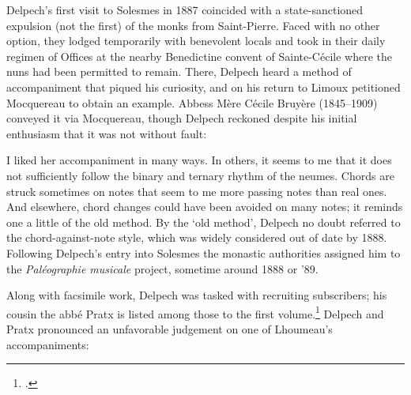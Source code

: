 Delpech's first visit to Solesmes in 1887 coincided with a state-sanctioned expulsion (not the first) of the monks from Saint-Pierre.
Faced with no other option, they lodged temporarily with benevolent locals and took in their daily regimen of Offices at the nearby Benedictine convent of Sainte-Cécile where the nuns had been permitted to remain.
There, Delpech heard a method of accompaniment that piqued his curiosity, and on his return to Limoux petitioned Mocquereau to obtain an example.
Abbess Mère Cécile Bruyère (1845--1909) conveyed it via Mocquereau, though Delpech reckoned despite his initial enthusiasm that it was not without fault:
\nowidow[2]

  {}
{I liked her accompaniment in many ways. In others, it seems to me that it does not sufficiently follow the binary and ternary rhythm of the neumes. Chords are struck sometimes on notes that seem to me more passing notes than real ones. And elsewhere, chord changes could have been avoided on many notes; it reminds one a little of the old method.}
\noindent
By the `old method', Delpech no doubt referred to the chord-against-note style, which was widely considered out of date by 1888.
Following Delpech's entry into Solesmes the monastic authorities assigned him to the \emph{Paléographie musicale} project, sometime around 1888 or '89.

Along with facsimile work, Delpech was tasked with recruiting subscribers; his cousin the abbé Pratx is listed among those to the first volume.\footcite[p.~7*]{MocquereauPaleographiemusicale1889}
Delpech and Pratx pronounced an unfavorable judgement on one of Lhoumeau's accompaniments:

